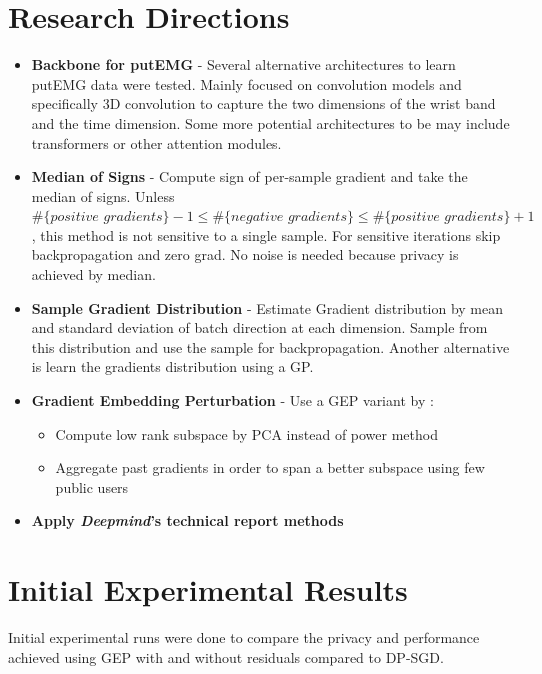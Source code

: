 \documentclass[fourier]{_style/dissertation}
\begin{document}
\section{Research Directions}
\begin{itemize}

    \item \textbf{Backbone for putEMG} - Several alternative architectures to learn putEMG data were tested. Mainly focused on convolution models and specifically 3D convolution to capture the two dimensions of the wrist band and the time dimension. Some more potential architectures to be may include transformers or other attention modules.

    \item \textbf{Median of Signs} -  Compute sign of per-sample gradient and take the median of signs. Unless \\ $\#\{ \textit{positive gradients}\} - 1 \leq \#\{\textit{negative gradients}\} \leq \#\{\textit{positive gradients}\} + 1 $, this method is not sensitive to a single sample. For sensitive iterations skip backpropagation and zero grad. No noise is needed because privacy is achieved by median.

    \item \textbf{Sample Gradient Distribution} - Estimate Gradient distribution by mean and standard deviation of batch direction at each dimension. Sample from this distribution and use the sample for backpropagation. Another alternative is learn the gradients distribution using a GP.

    \item \textbf{Gradient Embedding Perturbation} - Use a GEP variant
    by :
    \begin{itemize}
        \item Compute low rank subspace by PCA instead of power method
        \item Aggregate past gradients in order to span a better subspace using few public users
    \end{itemize}

    \item \textbf{Apply \textit{Deepmind}'s technical report \cite{DeUnlockingScale} methods}
        
\end{itemize}

\section{Initial Experimental Results}
Initial experimental runs  were done to compare the privacy and performance achieved using GEP with and without residuals compared to DP-SGD.
\end{document}
